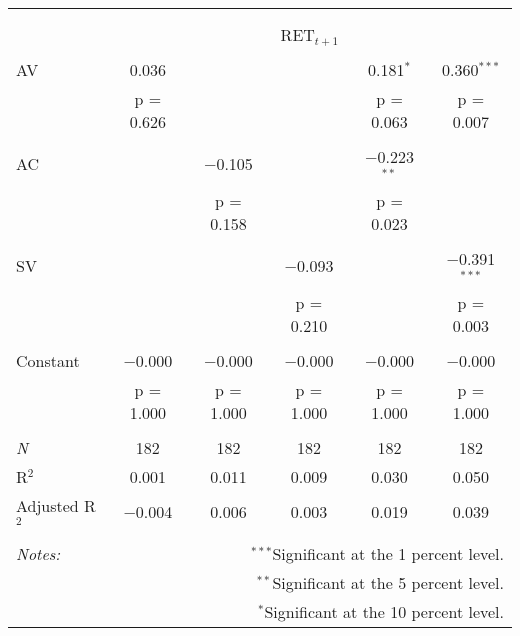 
\begin{tabular}{@{\extracolsep{5pt}}lccccc} 
\\[-1.8ex]\hline 
\hline \\[-1.8ex] 
\\[-1.8ex] & \multicolumn{5}{c}{RET$_{t+1}$} \\ 
\hline \\[-1.8ex] 
 AV & 0.036 &  &  & 0.181$^{*}$ & 0.360$^{***}$ \\ 
  & p = 0.626 &  &  & p = 0.063 & p = 0.007 \\ 
  & & & & & \\ 
 AC &  & $-$0.105 &  & $-$0.223$^{**}$ &  \\ 
  &  & p = 0.158 &  & p = 0.023 &  \\ 
  & & & & & \\ 
 SV &  &  & $-$0.093 &  & $-$0.391$^{***}$ \\ 
  &  &  & p = 0.210 &  & p = 0.003 \\ 
  & & & & & \\ 
 Constant & $-$0.000 & $-$0.000 & $-$0.000 & $-$0.000 & $-$0.000 \\ 
  & p = 1.000 & p = 1.000 & p = 1.000 & p = 1.000 & p = 1.000 \\ 
  & & & & & \\ 
\textit{N} & 182 & 182 & 182 & 182 & 182 \\ 
R$^{2}$ & 0.001 & 0.011 & 0.009 & 0.030 & 0.050 \\ 
Adjusted R$^{2}$ & $-$0.004 & 0.006 & 0.003 & 0.019 & 0.039 \\ 
\hline 
\hline \\[-1.8ex] 
\textit{Notes:} & \multicolumn{5}{r}{$^{***}$Significant at the 1 percent level.} \\ 
 & \multicolumn{5}{r}{$^{**}$Significant at the 5 percent level.} \\ 
 & \multicolumn{5}{r}{$^{*}$Significant at the 10 percent level.} \\ 
\end{tabular} 
